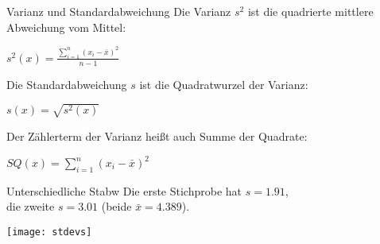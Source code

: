 \begin{frame}
  {Varianz und Standardabweichung}
    Die \alert{Varianz $s^2$} ist die quadrierte mittlere Abweichung vom Mittel:\\
      \begin{center}
	\alert{$s^2(x)=\frac{ \sum\limits_{i=1}^{n}(x_i-\bar{x})^2}{n-1}$}
      \end{center}
\pause
      \vspace{0.5cm}
    Die \alert{Standardabweichung $s$} ist die Quadratwurzel der Varianz:\\
      \begin{center}
	\alert{$s(x)=\sqrt{s^2(x)}$}
      \end{center}
      \vspace{0.5cm}

  \pause
    Der Zählerterm der Varianz heißt auch \alert{Summe der Quadrate}:\\
  \begin{center}
    $SQ(x)=\sum\limits_{i=1}^{n}(x_i-\bar{x})^2$
  \end{center}
\end{frame}

\begin{frame}
  {Unterschiedliche Stabw}
  Die erste Stichprobe hat $s=1.91$,\\
  die zweite $s=3.01$ (beide $\bar{x}=4.389$).
  \vspace{-2cm}
  \begin{center}
    \texttt{[image: stdevs]}
  \end{center}
\end{frame}


